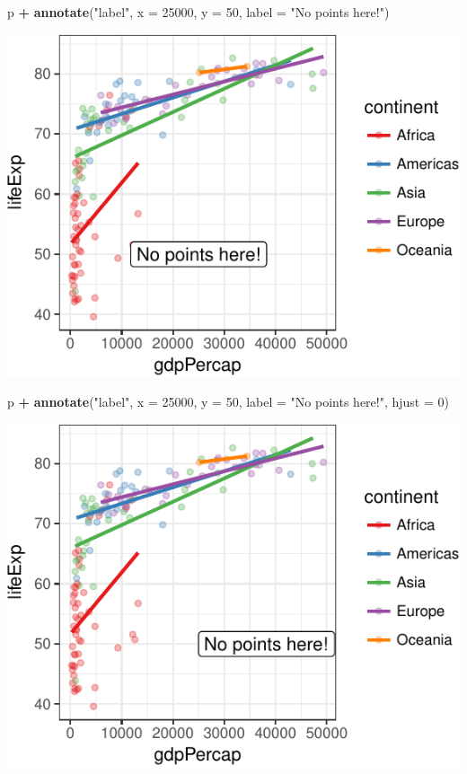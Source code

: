\documentclass[12pt,]{krantz}
\makeatletter
\newenvironment{Shaded}{\begin{snugshade}}{\end{snugshade}}
\newcommand{\DataTypeTok}[1]{\textcolor[rgb]{0.13,0.29,0.53}{#1}}
\newcommand{\DecValTok}[1]{\textcolor[rgb]{0.00,0.00,0.81}{#1}}
\newcommand{\KeywordTok}[1]{\textcolor[rgb]{0.13,0.29,0.53}{\textbf{#1}}}
\newcommand{\NormalTok}[1]{#1}
\newcommand{\OperatorTok}[1]{\textcolor[rgb]{0.81,0.36,0.00}{\textbf{#1}}}
\newcommand{\StringTok}[1]{\textcolor[rgb]{0.31,0.60,0.02}{#1}}
\newenvironment{kframe}{%
\medskip{}
\setlength{\fboxsep}{.8em}
 \def\at@end@of@kframe{}%
 \ifinner\ifhmode%
  \def\at@end@of@kframe{\end{minipage}}%
  \begin{minipage}{\columnwidth}%
 \fi\fi%
 \def\FrameCommand##1{\hskip\@totalleftmargin \hskip-\fboxsep
 \colorbox{shadecolor}{##1}\hskip-\fboxsep
     \hskip-\linewidth \hskip-\@totalleftmargin \hskip\columnwidth}%
 \MakeFramed {\advance\hsize-\width
   \@totalleftmargin\z@ \linewidth\hsize
   \@setminipage}}%
 {\par\unskip\endMakeFramed%
 \at@end@of@kframe}
\renewenvironment{Shaded}{\begin{kframe}}{\end{kframe}}
\theoremstyle{definition}
\theoremstyle{definition}
\theoremstyle{definition}
\theoremstyle{remark}
\makeatother
\begin{document}
\begin{Shaded}
\begin{Highlighting}[]
\NormalTok{p }\OperatorTok{+}
\StringTok{  }\KeywordTok{annotate}\NormalTok{(}\StringTok{"label"}\NormalTok{,}
           \DataTypeTok{x =} \DecValTok{25000}\NormalTok{,}
           \DataTypeTok{y =} \DecValTok{50}\NormalTok{,}
           \DataTypeTok{label =} \StringTok{"No points here!"}\NormalTok{)}
\end{Highlighting}
\end{Shaded}

\includegraphics{05_fine_tuning_plots_files/figure-latex/unnamed-chunk-16-1.pdf}

\begin{Shaded}
\begin{Highlighting}[]
\NormalTok{p }\OperatorTok{+}
\StringTok{  }\KeywordTok{annotate}\NormalTok{(}\StringTok{"label"}\NormalTok{,}
           \DataTypeTok{x =} \DecValTok{25000}\NormalTok{, }
           \DataTypeTok{y =} \DecValTok{50}\NormalTok{,}
           \DataTypeTok{label =} \StringTok{"No points here!"}\NormalTok{, }
           \DataTypeTok{hjust =} \DecValTok{0}\NormalTok{)}
\end{Highlighting}
\end{Shaded}

\includegraphics{05_fine_tuning_plots_files/figure-latex/unnamed-chunk-17-1.pdf}
\end{document}
